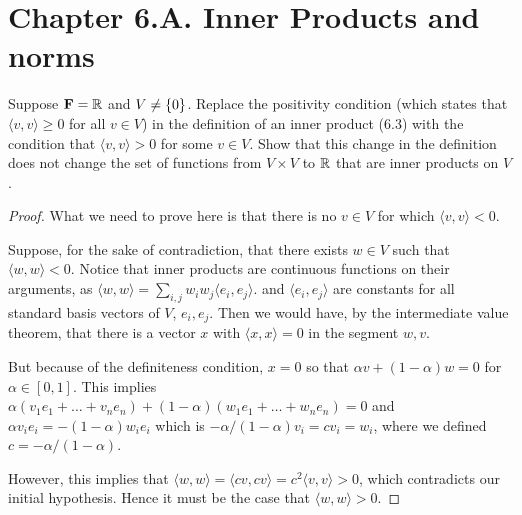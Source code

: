 \section*{Chapter 6.A. Inner Products and norms}


\begin{exercise}{3}
  Suppose $\mathbf{F}=\mathbb{R}$ and $V\neq\{0\}$. Replace the positivity condition (which states that $\langle v, v\rangle\geq 0$ for all $v\in V$) in the definition of an inner product (6.3) with the condition that $\langle v, v\rangle>0$ for some $v\in V$. Show that this change in the definition does not change the set of functions from $V\times V$ to $\mathbb{R}$ that are inner products on $V$.
\end{exercise}
\begin{proof}
 What we need to prove here is that there is no $v\in V$ for which $\langle v, v\rangle<0$. 
 
 Suppose, for the sake of contradiction, that there exists $w\in V$ such that $\langle w, w\rangle<0$. Notice that inner products are continuous functions on their arguments, as $\langle w,w\rangle =\sum_{i,j}w_iw_j\langle e_i, e_j\rangle$. and $\langle e_i,e_j\rangle$ are constants for all standard basis vectors  of $V$, $e_i,e_j$. Then we would have, by the intermediate value theorem, that there is a vector $x$ with $\langle x,x\rangle =0$ in the segment $w,v$. 
 
 But because of the definiteness condition, $x=0$ so that $\alpha v +(1-\alpha) w=0$ for $\alpha\in [0,1]$. This implies $\alpha(v_1e_1+\dots+v_ne_n)+(1-\alpha)(w_1e_1+\dots+w_ne_n)=0$ and $\alpha v_ie_i=-(1-\alpha)w_ie_i$ which is $-\alpha/(1-\alpha)v_i=cv_i=w_i$, where we defined $c=-\alpha/(1-\alpha)$.

 However, this implies that $\langle w,w\rangle = \langle cv,cv\rangle = c^2\langle v,v\rangle > 0$, which contradicts our initial hypothesis. Hence it must be the case that $\langle w,w\rangle>0$.
\end{proof}

